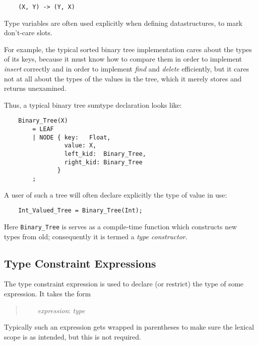\begin{verbatim}
    (X, Y) -> (Y, X)
\end{verbatim}

Type variables are often used explicitly when defining 
datastructures, to mark don't-care slots.

For example, the typical sorted binary tree implementation cares about 
the types of its keys, because it must know how to compare them in 
order to implement {\it insert} correctly and in order to implement 
{\it find} and {\it delete} efficiently, but it cares not at all about 
the types of the values in the tree, which it merely stores and 
returns unexamined.

Thus, a typical binary tree sumtype declaration looks like:

\begin{verbatim}
    Binary_Tree(X)
        = LEAF
        | NODE { key:   Float,
                 value: X,
                 left_kid:  Binary_Tree,
                 right_kid: Binary_Tree
               }
        ;
\end{verbatim}

A user of such a tree will often declare 
explicitly the type of value in use:

\begin{verbatim}
    Int_Valued_Tree = Binary_Tree(Int);
\end{verbatim}

Here {\tt Binary\_Tree} is serves as a compile-time function which  
constructs new types from old;  consequently it is termed a 
{\it type constructor}.

\cutend*


\subsection{Type Constraint Expressions}
\label{section:ref:types:type-constraint-expressions}

The type constraint expression is used to declare (or restrict) the type of some expression. 
It takes the form

\begin{quotation}
~~~~{\it expression}: {\it type}
\end{quotation}

Typically such an expression gets wrapped in parentheses to make sure 
the lexical scope is as intended, but this is not required.

